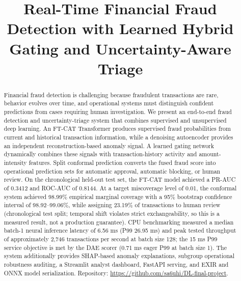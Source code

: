 \documentclass[conference]{IEEEtran}
\begin{document}
\title{Real-Time Financial Fraud Detection with Learned Hybrid Gating and Uncertainty-Aware Triage}

\author{
}

\maketitle

\begin{abstract}
Financial fraud detection is challenging because fraudulent transactions are rare,
behavior evolves over time, and operational systems must distinguish confident
predictions from cases requiring human investigation. We present an end-to-end
fraud detection and uncertainty-triage system that combines supervised and
unsupervised deep learning. An FT-CAT Transformer produces supervised fraud
probabilities from current and historical transaction information, while a
denoising autoencoder provides an independent reconstruction-based anomaly
signal. A learned gating network dynamically combines these signals with
transaction-history activity and amount-intensity features. Split conformal
prediction converts the fused fraud score into operational prediction sets for
automatic approval, automatic blocking, or human review. On the chronological
held-out test set, the FT-CAT model achieved a PR-AUC of 0.3412 and ROC-AUC of
0.8144. At a target miscoverage level of 0.01, the conformal system achieved
98.99\% empirical marginal coverage with a 95\% bootstrap confidence interval of
98.92--99.06\%, while assigning 23.19\% of transactions to human review
(chronological test split; temporal shift violates strict exchangeability, so
this is a measured result, not a production guarantee).
CPU benchmarking measured a median batch-1 neural inference latency of 6.56 ms
(P99 26.95 ms) and peak tested throughput of approximately 2,746 transactions
per second at batch size 128; the 15 ms P99 service objective is met by the
DAE scorer (0.71 ms eager P99 at batch size 1). The system additionally provides
SHAP-based anomaly explanations, subgroup operational robustness auditing,
a Streamlit analyst dashboard, FastAPI serving, and EXIR and ONNX model
serialization. Repository:
\url{https://github.com/sa6uhi/DL-final-project}.
\end{abstract}
\end{document}
